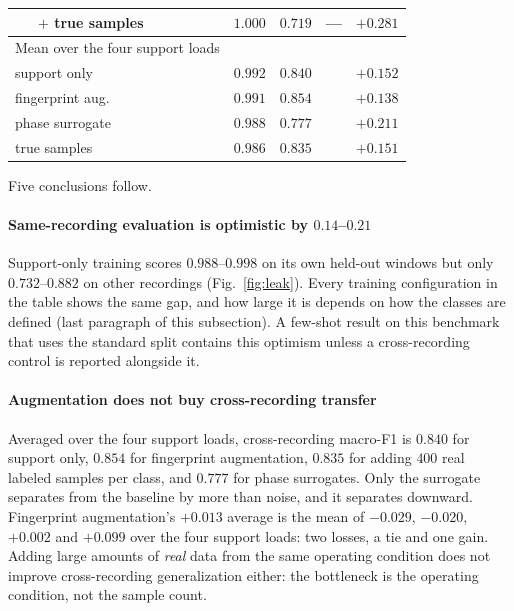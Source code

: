 \documentclass[preprint,12pt]{elsarticle}
\begin{document}
\begin{table}[t]
{\begin{tabular}{llcccc}
 & $+$ true samples         & $1.000$ & $0.719$ & --- & $+0.281$ \\
\midrule
\multicolumn{2}{l}{Mean over the four support loads} & & & & \\
\multicolumn{2}{l}{\quad support only}      & $0.992$ & $0.840$ & & $+0.152$ \\
\multicolumn{2}{l}{\quad fingerprint aug.}  & $0.991$ & $0.854$ & & $+0.138$ \\
\multicolumn{2}{l}{\quad phase surrogate}  & $0.988$ & $0.777$ & & $+0.211$ \\
\multicolumn{2}{l}{\quad true samples}  & $0.986$ & $0.835$ & & $+0.151$ \\
\bottomrule
\end{tabular}
}  %
\end{table}

Five conclusions follow.

\paragraph{Same-recording evaluation is optimistic by $0.14$--$0.21$}
Support-only training scores $0.988$--$0.998$ on its own held-out windows but
only $0.732$--$0.882$ on other recordings (Fig.~\ref{fig:leak}). Every training
configuration in the table shows the same gap, and how large it is depends on
how the classes are defined (last paragraph of this subsection). A few-shot result on this
benchmark that uses the standard split contains this optimism unless a
cross-recording control is reported alongside it.

\paragraph{Augmentation does not buy cross-recording transfer}
Averaged over the four support loads, cross-recording macro-F1 is $0.840$ for
support only, $0.854$ for fingerprint augmentation, $0.835$ for adding $400$
real labeled samples per class, and $0.777$ for phase surrogates. Only the
surrogate separates from the baseline by more than noise, and it separates
downward. Fingerprint augmentation's $+0.013$ average is the mean of
$-0.029$, $-0.020$, $+0.002$ and $+0.099$ over the four support loads: two
losses, a tie and one gain. Adding large amounts of \emph{real} data from
the same operating condition does not improve cross-recording generalization
either: the bottleneck is the operating condition, not the sample count.
\end{document}

